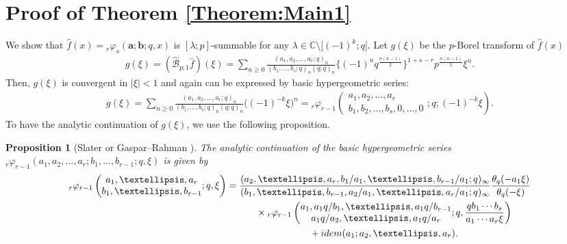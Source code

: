 \documentclass[11pt]{article}
\numberwithin{equation}{section}
\newtheorem{Proposition}[Theorem]{Proposition}
\newcommand{\idem}{{\rm idem}}
\begin{document}
\section{Proof of Theorem \ref{Theorem:Main1}}\label{Section:Proof_Main1}
We show that $\hat{f}(x)={}_r\varphi_s(\bm{a};\bm{b};q,x)$ is $[\lambda;p]$-summable for any $\lambda\in\mathbb{C}\setminus\big[(-1)^k;q\big]$. Let $g(\xi)$ be the $p$-Borel transform of $\hat{f}(x)$
\begin{gather*}
g(\xi)=(\hat{\mathcal{B}}_{p;1}\hat{f})(\xi)=\sum_{n\ge0}\frac{(a_1,a_2,\ldots,a_r;q)_n}{(b_1,\ldots,b_s;q)_n(q;q)_n}\big\{(-1)^nq^{\frac{n(n-1)}{2}}\big\}^{1+s-r}p^{\frac{n(n-1)}{2}}\xi^n.
\end{gather*}
Then, $g(\xi)$ is convergent in $|\xi|<1$ and again can be expressed by basic hypergeometric series:
\begin{gather*}
g(\xi)=\sum_{n\ge0}\frac{(a_1,a_2,\ldots,a_r;q)_n}{(b_1,\ldots,b_s;q)_n(q;q)_n}\big((-1)^{-k}\xi\big)^n={}_r\varphi_{r-1}\left(
\begin{matrix}
a_1,a_2,\ldots,a_r\\
b_1,b_2,\ldots,b_s,0,\ldots,0
\end{matrix}
;q;(-1)^{-k}\xi
\right).
\end{gather*}
To have the analytic continuation of $g(\xi)$, we use the following proposition.
\begin{Proposition}[Slater \cite{Slater1952} or Gaspar--Rahman {\cite[Section~4.5]{Gasper&Rahman2004}}] The analytic continuation of the basic hypergeometric series ${}_r\varphi_{r-1}(a_1,a_2,\ldots,a_r;b_1,\ldots,b_{r-1};q,\xi)$ is given by
\begin{gather}
{}_r\varphi_{r-1}\left(
\begin{matrix}a_1,\ldots,a_r\\
b_1,\ldots,b_{r-1}
\end{matrix};q,\xi\right)=\frac{(a_2,\ldots,a_r,b_1/a_1,\ldots,b_{r-1}/a_1;q)_\infty}{(b_1,\ldots,b_{r-1},a_2/a_1,\ldots,a_r/a_1;q)_\infty}\frac{\theta_q(-a_1\xi)}{\theta_q(-\xi)}\nonumber\\
\hphantom{{}_r\varphi_{r-1}\left(
\begin{matrix}a_1,\ldots,a_r\\
b_1,\ldots,b_{r-1}
\end{matrix};q,\xi\right)=}{} \times{}_r\varphi_{r-1}\left(
\begin{matrix}a_1,a_1q/b_1,\ldots,a_1q/b_{r-1}\\
a_1q/a_2,\ldots,a_1q/a_r
\end{matrix};q,\frac{qb_1\cdots b_{s}}{a_1\cdots a_r\xi }\right)\nonumber\\
\hphantom{{}_r\varphi_{r-1}\left(
\begin{matrix}a_1,\ldots,a_r\\
b_1,\ldots,b_{r-1}
\end{matrix};q,\xi\right)=}{} +\idem(a_1;a_2,\ldots,a_r).\label{r,r-1AC}
\end{gather}
\end{Proposition}
\end{document}
